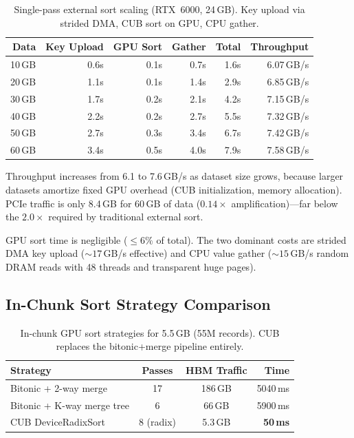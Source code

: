 \documentclass[conference,10pt]{IEEEtran}
\begin{document}
\begin{table}[t]
  \centering
  \caption{Single-pass external sort scaling (RTX~6000, 24\,GB).
  Key upload via strided DMA, CUB sort on GPU, CPU gather.}
  \label{tab:scaling}
  \begin{tabular}{@{}rrrrrr@{}}
    \toprule
    Data & Key Upload & GPU Sort & Gather & Total & Throughput \\
    \midrule
    10\,GB & 0.6s & 0.1s & 0.7s &  1.6s & 6.07\,GB/s \\
    20\,GB & 1.1s & 0.1s & 1.4s &  2.9s & 6.85\,GB/s \\
    30\,GB & 1.7s & 0.2s & 2.1s &  4.2s & 7.15\,GB/s \\
    40\,GB & 2.2s & 0.2s & 2.7s &  5.5s & 7.32\,GB/s \\
    50\,GB & 2.7s & 0.3s & 3.4s &  6.7s & 7.42\,GB/s \\
    60\,GB & 3.4s & 0.5s & 4.0s &  7.9s & 7.58\,GB/s \\
    \bottomrule
  \end{tabular}
\end{table}

Throughput increases from 6.1 to 7.6\,GB/s as dataset size grows,
because larger datasets amortize fixed GPU overhead (CUB initialization,
memory allocation).  PCIe traffic is only 8.4\,GB for 60\,GB of data
($0.14\times$ amplification)---far below the $2.0\times$ required by
traditional external sort.

GPU sort time is negligible (${\leq}6\%$ of total).  The two dominant
costs are strided DMA key upload (${\sim}17$\,GB/s effective) and
CPU value gather (${\sim}15$\,GB/s random DRAM reads with 48 threads
and transparent huge pages).

\subsection{In-Chunk Sort Strategy Comparison}

\begin{table}[t]
  \centering
  \caption{In-chunk GPU sort strategies for 5.5\,GB (55M records).
  CUB replaces the bitonic+merge pipeline entirely.}
  \label{tab:merge_comparison}
  \begin{tabular}{@{}lccr@{}}
    \toprule
    \textbf{Strategy} & \textbf{Passes} & \textbf{HBM Traffic} & \textbf{Time} \\
    \midrule
    Bitonic + 2-way merge  & 17 & 186\,GB & 5040\,ms \\
    Bitonic + K-way merge tree & 6  & 66\,GB & 5900\,ms \\
    CUB DeviceRadixSort    & 8 (radix)  & 5.3\,GB & \textbf{50\,ms} \\
    \bottomrule
  \end{tabular}
\end{table}
\end{document}
